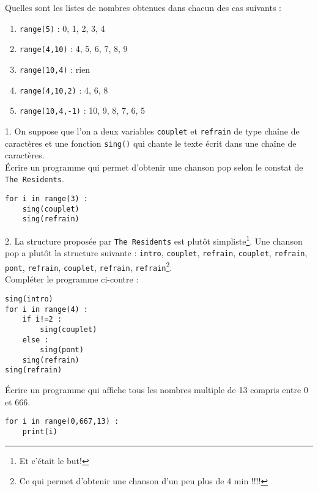 \begin{cor}
Quelles sont les listes de nombres obtenues dans chacun des cas suivants :
\begin{enumerate}
	\item \texttt{range(5)} : 0, 1, 2, 3, 4
	\item \texttt{range(4,10)} : 4, 5, 6, 7, 8, 9
	\item \texttt{range(10,4)} : rien
	\item \texttt{range(4,10,2)} : 4, 6, 8
	\item \texttt{range(10,4,-1)} : 10, 9, 8, 7, 6, 5
\end{enumerate}
\end{cor}

\begin{cor}
\begin{multicols}{2}
1. On suppose que l'on a deux variables \texttt{couplet} et \texttt{refrain} de type chaîne de caractères et une fonction \texttt{sing()} qui chante le texte écrit dans une chaîne de caractères.\\
Écrire un programme qui permet d'obtenir une chanson pop selon le constat de \texttt{The Residents}.
\columnbreak
\begin{lstlisting}
for i in range(3) :
	sing(couplet)
	sing(refrain)
\end{lstlisting}
\end{multicols}
\begin{multicols}{2}
2. La structure proposée par \texttt{The Residents} est plutôt simpliste\footnote{Et c'était le but!}. Une chanson pop a plutôt la structure suivante : \texttt{intro}, \texttt{couplet}, \texttt{refrain}, \texttt{couplet}, \texttt{refrain}, \texttt{pont}, \texttt{refrain}, \texttt{couplet}, \texttt{refrain}, \texttt{refrain}\footnote{Ce qui permet d'obtenir une chanson d'un peu plus de 4 min !!!!}.\\
Compléter le programme ci-contre : \\
\columnbreak
\begin{lstlisting}
sing(intro)
for i in range(4) :
	if i!=2 :
		sing(couplet)
	else :
		sing(pont)
	sing(refrain)
sing(refrain)
\end{lstlisting}
\end{multicols}
\end{cor}

\begin{cor}
\begin{multicols}{2}
Écrire un programme qui affiche tous les nombres multiple de 13 compris entre 0 et 666. \\
\columnbreak
\begin{lstlisting}
for i in range(0,667,13) :
	print(i)
\end{lstlisting}
\end{multicols}
\end{cor}








